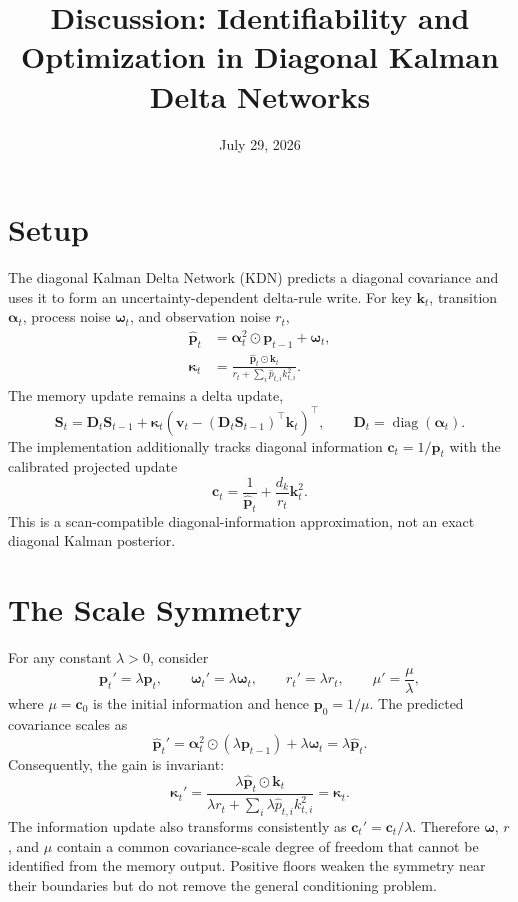 \documentclass[11pt]{article}
\title{Discussion: Identifiability and Optimization in Diagonal Kalman Delta Networks}
\author{}
\date{July 29, 2026}
\newcommand{\vct}[1]{\boldsymbol{#1}}
\newcommand{\diag}{\operatorname{diag}}
\begin{document}
\maketitle

\section{Setup}

The diagonal Kalman Delta Network (KDN) predicts a diagonal covariance and uses it to form
an uncertainty-dependent delta-rule write. For key $\vct{k}_t$, transition
$\vct{\alpha}_t$, process noise $\vct{\omega}_t$, and observation noise $r_t$,
\begin{align}
  \widehat{\vct{p}}_t
    &= \vct{\alpha}_t^2\odot\vct{p}_{t-1}+\vct{\omega}_t, \\
  \vct{\kappa}_t
    &= \frac{\widehat{\vct{p}}_t\odot\vct{k}_t}
      {r_t+\sum_i\widehat p_{t,i}k_{t,i}^2}.
\end{align}
The memory update remains a delta update,
\begin{equation}
  \vct{S}_t
  = \vct{D}_t\vct{S}_{t-1}
  + \vct{\kappa}_t
    \left(\vct{v}_t-(\vct{D}_t\vct{S}_{t-1})^\top\vct{k}_t\right)^\top,
  \qquad \vct{D}_t=\diag(\vct{\alpha}_t).
\end{equation}
The implementation additionally tracks diagonal information $\vct{c}_t=1/\vct{p}_t$ with
the calibrated projected update
\begin{equation}
  \vct{c}_t
  = \frac{1}{\widehat{\vct{p}}_t}
  + \frac{d_k}{r_t}\vct{k}_t^2.
\end{equation}
This is a scan-compatible diagonal-information approximation, not an exact diagonal Kalman
posterior.

\section{The Scale Symmetry}
\label{sec:discussion-scale-symmetry}

For any constant $\lambda>0$, consider
\begin{equation}
  \vct{p}_t' = \lambda\vct{p}_t,
  \qquad
  \vct{\omega}_t'=\lambda\vct{\omega}_t,
  \qquad
  r_t'=\lambda r_t,
  \qquad
  \mu'=\frac{\mu}{\lambda},
\end{equation}
where $\mu=\vct{c}_0$ is the initial information and hence
$\vct{p}_0=1/\mu$. The predicted covariance scales as
\begin{equation}
  \widehat{\vct{p}}_t'
  = \vct{\alpha}_t^2\odot(\lambda\vct{p}_{t-1})
    +\lambda\vct{\omega}_t
  = \lambda\widehat{\vct{p}}_t.
\end{equation}
Consequently, the gain is invariant:
\begin{equation}
  \vct{\kappa}_t'
  = \frac{\lambda\widehat{\vct{p}}_t\odot\vct{k}_t}
    {\lambda r_t+\sum_i\lambda\widehat p_{t,i}k_{t,i}^2}
  = \vct{\kappa}_t.
\end{equation}
The information update also transforms consistently as
$\vct{c}_t'=\vct{c}_t/\lambda$. Therefore $\vct{\omega}$, $r$, and $\mu$
contain a common covariance-scale degree of freedom that cannot be identified from the memory
output. Positive floors weaken the symmetry near their boundaries but do not remove the general
conditioning problem.
\end{document}
